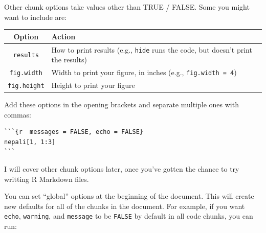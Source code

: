 \documentclass[]{book}
\theoremstyle{definition}
\theoremstyle{definition}
\theoremstyle{definition}
\theoremstyle{remark}
\begin{document}
Other chunk options take values other than TRUE / FALSE. Some you might
want to include are:

\begin{longtable}[]{@{}cl@{}}
\toprule
\begin{minipage}[b]{0.20\columnwidth}\centering\strut
Option\strut
\end{minipage} & \begin{minipage}[b]{0.67\columnwidth}\raggedright\strut
Action\strut
\end{minipage}\tabularnewline
\midrule
\endhead
\begin{minipage}[t]{0.20\columnwidth}\centering\strut
\texttt{results}\strut
\end{minipage} & \begin{minipage}[t]{0.67\columnwidth}\raggedright\strut
How to print results (e.g., \texttt{hide} runs the code, but doesn't
print the results)\strut
\end{minipage}\tabularnewline
\begin{minipage}[t]{0.20\columnwidth}\centering\strut
\texttt{fig.width}\strut
\end{minipage} & \begin{minipage}[t]{0.67\columnwidth}\raggedright\strut
Width to print your figure, in inches (e.g.,
\texttt{fig.width\ =\ 4})\strut
\end{minipage}\tabularnewline
\begin{minipage}[t]{0.20\columnwidth}\centering\strut
\texttt{fig.height}\strut
\end{minipage} & \begin{minipage}[t]{0.67\columnwidth}\raggedright\strut
Height to print your figure\strut
\end{minipage}\tabularnewline
\bottomrule
\end{longtable}

Add these options in the opening brackets and separate multiple ones
with commas:

\begin{verbatim}
```{r  messages = FALSE, echo = FALSE}
nepali[1, 1:3]
```
\end{verbatim}

I will cover other chunk options later, once you've gotten the chance to
try writting R Markdown files.

You can set ``global'' options at the beginning of the document. This
will create new defaults for all of the chunks in the document. For
example, if you want \texttt{echo}, \texttt{warning}, and
\texttt{message} to be \texttt{FALSE} by default in all code chunks, you
can run:
\end{document}

